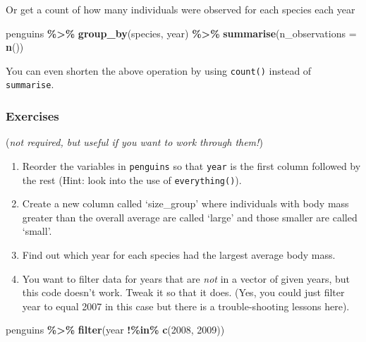 \documentclass[
]{book}
\newenvironment{Shaded}{\begin{snugshade}}{\end{snugshade}}
\newcommand{\AttributeTok}[1]{\textcolor[rgb]{0.13,0.29,0.53}{#1}}
\newcommand{\DecValTok}[1]{\textcolor[rgb]{0.00,0.00,0.81}{#1}}
\newcommand{\FunctionTok}[1]{\textcolor[rgb]{0.13,0.29,0.53}{\textbf{#1}}}
\newcommand{\NormalTok}[1]{#1}
\newcommand{\SpecialCharTok}[1]{\textcolor[rgb]{0.81,0.36,0.00}{\textbf{#1}}}
\begin{document}
Or get a count of how many individuals were observed for each species each year

\begin{Shaded}
\begin{Highlighting}[]
\NormalTok{penguins }\SpecialCharTok{\%\textgreater{}\%} 
  \FunctionTok{group\_by}\NormalTok{(species, year) }\SpecialCharTok{\%\textgreater{}\%} 
  \FunctionTok{summarise}\NormalTok{(}\AttributeTok{n\_observations =} \FunctionTok{n}\NormalTok{())}
\end{Highlighting}
\end{Shaded}

You can even shorten the above operation by using \texttt{count()} instead of \texttt{summarise}.

\hypertarget{exercises-1}{%
\subsubsection{Exercises}\label{exercises-1}}

(\emph{not required, but useful if you want to work through them!})

\begin{enumerate}
\def\labelenumi{\arabic{enumi}.}
\item
  Reorder the variables in \texttt{penguins} so that \texttt{year} is the first column followed by the rest (Hint: look into the use of \texttt{everything()}).
\item
  Create a new column called `size\_group' where individuals with body mass greater than the overall average are called `large' and those smaller are called `small'.
\item
  Find out which year for each species had the largest average body mass.
\item
  You want to filter data for years that are \emph{not} in a vector of given years, but this code doesn't work. Tweak it so that it does. (Yes, you could just filter year to equal 2007 in this case but there is a trouble-shooting lessons here).
\end{enumerate}

\begin{Shaded}
\begin{Highlighting}[]
\NormalTok{    penguins }\SpecialCharTok{\%\textgreater{}\%} 
      \FunctionTok{filter}\NormalTok{(year }\SpecialCharTok{!\%in\%} \FunctionTok{c}\NormalTok{(}\DecValTok{2008}\NormalTok{, }\DecValTok{2009}\NormalTok{))}
\end{Highlighting}
\end{Shaded}
\end{document}
